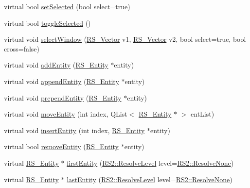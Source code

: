 \begin{DoxyCompactItemize}
\item 
virtual bool \hyperlink{classRS__EntityContainer_a31dd1b7d3456b65bdf6057658d71a225}{set\-Selected} (bool select=true)
\item 
virtual bool \hyperlink{classRS__EntityContainer_a8968fbafa852669e3a2fdf11672dbd73}{toggle\-Selected} ()
\item 
virtual void \hyperlink{classRS__EntityContainer_ab452cb55d7c9a92ba90e85daf4f4bbe7}{select\-Window} (\hyperlink{classRS__Vector}{R\-S\-\_\-\-Vector} v1, \hyperlink{classRS__Vector}{R\-S\-\_\-\-Vector} v2, bool select=true, bool cross=false)
\item 
virtual void \hyperlink{classRS__EntityContainer_a707175a62e2b4171691f90570f3867b3}{add\-Entity} (\hyperlink{classRS__Entity}{R\-S\-\_\-\-Entity} $\ast$entity)
\item 
virtual void \hyperlink{classRS__EntityContainer_a20582592804757c8d98c03cbae6f5969}{append\-Entity} (\hyperlink{classRS__Entity}{R\-S\-\_\-\-Entity} $\ast$entity)
\item 
virtual void \hyperlink{classRS__EntityContainer_aa00cac9d10bf7941a2de2c2c64ef9ccf}{prepend\-Entity} (\hyperlink{classRS__Entity}{R\-S\-\_\-\-Entity} $\ast$entity)
\item 
virtual void \hyperlink{classRS__EntityContainer_a15ae6624079319e4b41709b7f79e67b1}{move\-Entity} (int index, Q\-List$<$ \hyperlink{classRS__Entity}{R\-S\-\_\-\-Entity} $\ast$ $>$ ent\-List)
\item 
virtual void \hyperlink{classRS__EntityContainer_a1feeab096b77c19c3dbc6830db16f985}{insert\-Entity} (int index, \hyperlink{classRS__Entity}{R\-S\-\_\-\-Entity} $\ast$entity)
\item 
virtual bool \hyperlink{classRS__EntityContainer_ace30e0631a483e5d66dcaea3ea0cce6b}{remove\-Entity} (\hyperlink{classRS__Entity}{R\-S\-\_\-\-Entity} $\ast$entity)
\item 
virtual \hyperlink{classRS__Entity}{R\-S\-\_\-\-Entity} $\ast$ \hyperlink{classRS__EntityContainer_a1bbe3e64e15847946716b9a10dbda603}{first\-Entity} (\hyperlink{classRS2_a1b2c5e3a3e9d1b03a9564229255faa20}{R\-S2\-::\-Resolve\-Level} level=\hyperlink{classRS2_a1b2c5e3a3e9d1b03a9564229255faa20aecb7396f39bc313ad8903c8a5fac5a50}{R\-S2\-::\-Resolve\-None})
\item 
virtual \hyperlink{classRS__Entity}{R\-S\-\_\-\-Entity} $\ast$ \hyperlink{classRS__EntityContainer_a4c6e29dcb55dd101f8b98a848235bf5c}{last\-Entity} (\hyperlink{classRS2_a1b2c5e3a3e9d1b03a9564229255faa20}{R\-S2\-::\-Resolve\-Level} level=\hyperlink{classRS2_a1b2c5e3a3e9d1b03a9564229255faa20aecb7396f39bc313ad8903c8a5fac5a50}{R\-S2\-::\-Resolve\-None})

\end{DoxyCompactItemize}
